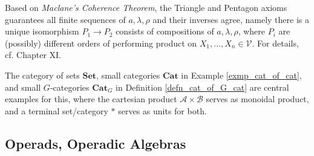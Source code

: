 \documentclass[openany, amssymb, psamsfonts]{amsart}
\theoremstyle{definition}
\numberwithin{equation}{section}
\newcommand{\Cat}{\mathbf{Cat}} %
\newcommand{\Sets}{\mathbf{Set}} %
\newcommand{\A}{\mathscr{A}}
\newcommand{\B}{\mathscr{B}}
\begin{document}
Based on \emph{Maclane's Coherence Theorem}, the Triangle and Pentagon axioms guarantees all finite sequences of $a,\lambda,\rho$ and their inverses agree, namely there is a unique isomorphism $P_1\rightarrow P_2$ consists of compositions of $a,\lambda,\rho$, where $P_i$ are (possibly) different orders of performing product on $X_1,...,X_n\in\mathcal{V}$. For details, cf. \cite{M98} Chapter XI.

The category of sets $\Sets$, small categories $\Cat$ in Example \ref{exmp_cat_of_cat}, and small $G$-categories $\Cat_G$ in Definition \ref{defn_cat_of_G_cat} are central examples for this, where the cartesian product $\A\times\B$ serves as monoidal product, and a terminal set/category $*$ serves as units for both.

\vspace{1pt}

\subsection{Operads, Operadic Algebras}\label{sub_operad}
\end{document}
